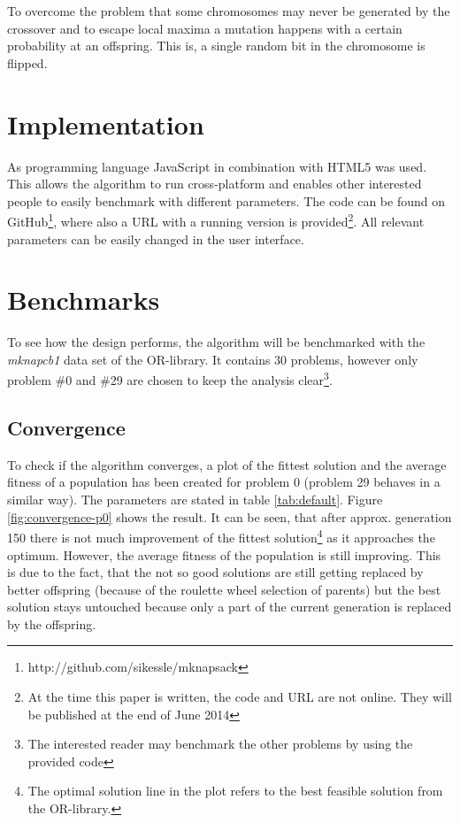 \documentclass[a4paper]{article}
\begin{document}
To overcome the problem that some chromosomes may never be generated by the crossover and to escape local maxima a mutation happens with a certain probability at an offspring. This is, a single random bit in the chromosome is flipped.

\section{Implementation}

As programming language JavaScript in combination with HTML5 was used. This allows the algorithm to run cross-platform and enables other interested people to easily benchmark with different parameters.  The code can be found on GitHub\footnote{http://github.com/sikessle/mknapsack}, where also a URL with a running version is provided\footnote{At the time this paper is written, the code and URL are not online. They will be published at the end of June 2014}. All relevant parameters can be easily changed in the user interface.

\section{Benchmarks}

To see how the design performs, the algorithm will be benchmarked with the \emph{mknapcb1} data set of the OR-library. It contains 30 problems, however only problem \#0 and \#29 are chosen to keep the analysis clear\footnote{The interested reader may benchmark the other problems by using the provided code}.

\subsection{Convergence}

To check if the algorithm converges, a plot of the fittest solution and the average fitness of a population has been created for problem 0 (problem 29 behaves in a similar  way). The parameters are stated in table \ref{tab:default}. Figure \ref{fig:convergence-p0} shows the result. It can be seen, that after approx. generation 150 there is not much improvement of the fittest solution\footnote{The optimal solution line in the plot refers to the best feasible solution from the OR-library.} as it approaches the optimum. However, the average fitness of the population is still improving. This is due to the fact, that the not so good solutions are still getting replaced by better offspring (because of the roulette wheel selection of parents) but the best solution stays untouched because only a part of the current generation is replaced by the offspring.
\end{document}
